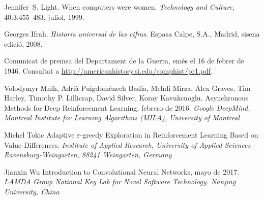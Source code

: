 \documentclass[11pt,spanish,listoffigures,listoftables]{tfgetsinf}
\begin{document}

\begin{thebibliography}{10}

   Jennifer~S. Light.
   \newblock When computers were women.
   \newblock \textit{Technology and Culture}, 40:3:455--483, juliol, 1999.

   Georges Ifrah.
   \newblock \textit{Historia universal de las cifras}.
   \newblock Espasa Calpe, S.A., Madrid, sisena edició, 2008.

   Comunicat de premsa del Departament de la Guerra, 
   emés el 16 de febrer de 1946. 
   \newblock Consultat a 
   \url{http://americanhistory.si.edu/comphist/pr1.pdf}.
   
	Volodymyr Mnih, Adrià Puigdomènech Badia, Mehdi Mirza, Alex Graves, Tim Harley, Timothy P. Lillicrap, David Silver, Koray Kavukcuoglu.
	\newblock Asynchronous Methods for Deep Reinforcement Learning,
	febrero de 2016.
	\newblock \textit {Google DeepMind, Montreal Institute for Learning Algorithms (MILA), University of Montreal}
	
	Michel Tokic
	\newblock Adaptive $\varepsilon$-greedy Exploration in Reinforcement Learning Based on Value Differences.
	\newblock \textit {Institute of Applied Research, University of Applied Sciences Ravensburg-Weingarten, 88241 Weingarten, Germany}
	
	Jianxin Wu
	\newblock Introduction to Convolutional Neural Networks,
	mayo de 2017.
	\newblock \textit {LAMDA Group \newblock National Key Lab for Novel Software Technology. Nanjing University, China}
	

\end{thebibliography}
\end{document}
